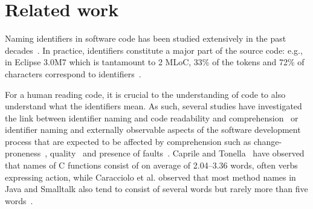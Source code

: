 \documentclass[conference]{IEEEtran}
\newcommand{\quotes}[1]{\textit{``#1''}}
\begin{document}
\section{Related work}
Naming identifiers in software code has been studied extensively in the past decades~\cite{AmanASK15,AnquetilL98,AvidanF17,Beniamini,ButlerWYS10,CaprileT00,HofmeisterSH17,LawrieMFB07,LunguK13,ScannielloR13,TakangGM96,Teasley,TramontanaRS14}. 
In practice, identifiers constitute a major part of the source code: e.g., in Eclipse 3.0M7 which is tantamount to 2 MLoC, 33\% of the tokens and 72\% of characters correspond to identifiers~\cite{Deissenbock}. 

For a human reading code, it is crucial to the understanding of code to also understand what the identifiers mean. As such, several studies have investigated the link between identifier naming and code readability and comprehension~\cite{AvidanF17,HofmeisterSH17,LawrieMFB07,TakangGM96,Teasley} or identifier naming and externally observable aspects of the software development process that are expected to be affected by comprehension such as change-proneness~\cite{AmanASK15}, quality~\cite{ButlerWYS10,LunguK13} and presence of faults~\cite{ScannielloR13,TramontanaRS14}.
Caprile and Tonella~\cite{CaprileTonella} have observed that names of C functions consist of on average of 2.04--3.36 words, often verbs expressing action, while Caracciolo et al. observed that most method names in Java and Smalltalk also tend to consist of several words but rarely more than five words~\cite{Caracciolo}.
\end{document}
